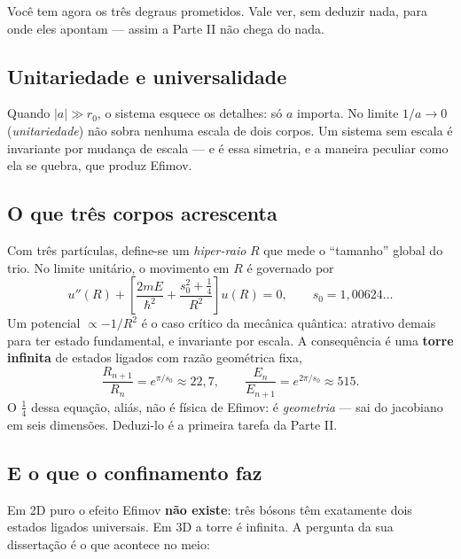 \documentclass[11pt,a4paper]{article}
\begin{document}
Você tem agora os três degraus prometidos. Vale ver, sem deduzir nada, para onde eles
apontam — assim a Parte II não chega do nada.

\subsection*{Unitariedade e universalidade}

Quando $|a|\gg r_{0}$, o sistema esquece os detalhes: só $a$ importa. No limite
$1/a\to0$ (\emph{unitariedade}) não sobra nenhuma escala de dois corpos. Um sistema
sem escala é invariante por mudança de escala — e é essa simetria, e a maneira
peculiar como ela se quebra, que produz Efimov.

\subsection*{O que três corpos acrescenta}

Com três partículas, define-se um \emph{hiper-raio} $R$ que mede o ``tamanho'' global
do trio. No limite unitário, o movimento em $R$ é governado por
\begin{equation}
u''(R) + \left[\frac{2mE}{\hbar^{2}} + \frac{s_{0}^{2}+\tfrac14}{R^{2}}\right]u(R)=0,
\qquad s_{0}=1{,}00624\dots
\end{equation}
Um potencial $\propto -1/R^{2}$ é o caso crítico da mecânica quântica: atrativo
demais para ter estado fundamental, e invariante por escala. A consequência é uma
\textbf{torre infinita} de estados ligados com razão geométrica fixa,
\begin{equation}
\frac{R_{n+1}}{R_{n}}=e^{\pi/s_{0}}\approx 22{,}7,
\qquad
\frac{E_{n}}{E_{n+1}}=e^{2\pi/s_{0}}\approx 515.
\end{equation}
O $\tfrac14$ dessa equação, aliás, não é física de Efimov: é \emph{geometria} —
sai do jacobiano em seis dimensões. Deduzi-lo é a primeira tarefa da Parte II.

\subsection*{E o que o confinamento faz}

Em 2D puro o efeito Efimov \textbf{não existe}: três bósons têm exatamente dois
estados ligados universais. Em 3D a torre é infinita. A pergunta da sua dissertação
é o que acontece no meio:

\begin{center}
\end{center}
\end{document}
